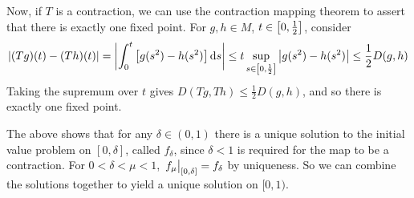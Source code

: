 Now, if \( T \) is a contraction, we can use the contraction mapping theorem to assert that there is exactly one fixed point.
For \( g,h \in M \), \( t \in \qty[0, \frac{1}{2}] \), consider
\[
	\abs{(Tg)(t) - (Th)(t)} = \abs{\int_0^t \qty[g(s^2) - h(s^2)] \dd{s}} \leq t \sup_{s \in \qty[0, \frac{1}{2}]} \abs{g(s^2) - h(s^2)} \leq \frac{1}{2} D(g,h)
\]
Taking the supremum over \( t \) gives \( D(Tg, Th) \leq \frac{1}{2} D(g,h) \), and so there is exactly one fixed point.
\begin{remark}
	The above shows that for any \( \delta \in (0, 1) \) there is a unique solution to the initial value problem on \( [0, \delta] \), called \( f_\delta \), since \( \delta < 1 \) is required for the map to be a contraction.
	For \( 0 < \delta < \mu < 1 \), \( \eval{f_\mu}_{[0,\delta]} = f_\delta \) by uniqueness.
	So we can combine the solutions together to yield a unique solution on \( [0,1) \).
\end{remark}

